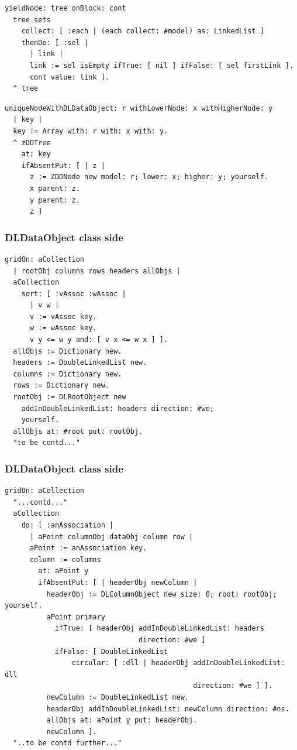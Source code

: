 \documentclass[10pt]{beamer}
\begin{document}
\begin{frame}[fragile]
\begin{verbatim}
yieldNode: tree onBlock: cont
  tree sets
    collect: [ :each | (each collect: #model) as: LinkedList ]
    thenDo: [ :sel | 
      | link |
      link := sel isEmpty ifTrue: [ nil ] ifFalse: [ sel firstLink ].
      cont value: link ].
  ^ tree
\end{verbatim}
\vfill
\begin{verbatim}
uniqueNodeWithDLDataObject: r withLowerNode: x withHigherNode: y
  | key |
  key := Array with: r with: x with: y.
  ^ zDDTree
    at: key
    ifAbsentPut: [ | z |
      z := ZDDNode new model: r; lower: x; higher: y; yourself.
      x parent: z.
      y parent: z.
      z ]
\end{verbatim}
\end{frame}


\begin{frame}[fragile]
\frametitle{DLDataObject class side}
\begin{verbatim}
gridOn: aCollection
  | rootObj columns rows headers allObjs |
  aCollection
    sort: [ :vAssoc :wAssoc | 
      | v w |
      v := vAssoc key.
      w := wAssoc key.
      v y <= w y and: [ v x <= w x ] ].
  allObjs := Dictionary new.
  headers := DoubleLinkedList new.
  columns := Dictionary new.
  rows := Dictionary new.
  rootObj := DLRootObject new
    addInDoubleLinkedList: headers direction: #we;
    yourself.
  allObjs at: #root put: rootObj.
  "to be contd..."
\end{verbatim}
\end{frame}

\begin{frame}[fragile]
\frametitle{DLDataObject class side}
\begin{verbatim}
gridOn: aCollection
  "...contd..."
  aCollection
    do: [ :anAssociation | 
      | aPoint columnObj dataObj column row |
      aPoint := anAssociation key.
      column := columns
        at: aPoint y
        ifAbsentPut: [ | headerObj newColumn |
          headerObj := DLColumnObject new size: 0; root: rootObj; yourself.
          aPoint primary
            ifTrue: [ headerObj addInDoubleLinkedList: headers 
                                direction: #we ]
            ifFalse: [ DoubleLinkedList
                circular: [ :dll | headerObj addInDoubleLinkedList: dll 
                                             direction: #we ] ].
          newColumn := DoubleLinkedList new.
          headerObj addInDoubleLinkedList: newColumn direction: #ns.
          allObjs at: aPoint y put: headerObj.
          newColumn ].
  "..to be contd further..."
\end{verbatim}
\end{frame}
\end{document}
